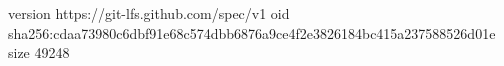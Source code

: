 version https://git-lfs.github.com/spec/v1
oid sha256:cdaa73980c6dbf91e68c574dbb6876a9ce4f2e3826184bc415a237588526d01e
size 49248

